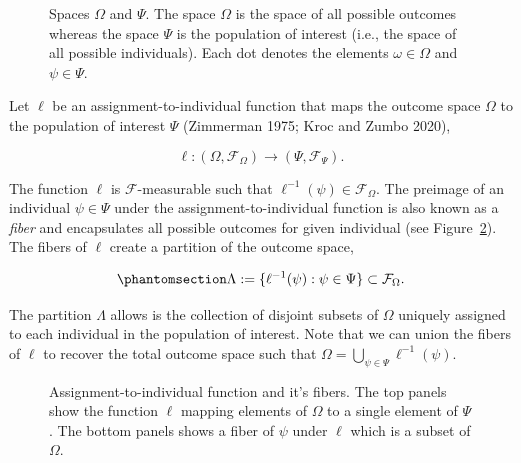 \documentclass[
  letterpaper,
  DIV=11,
  numbers=noendperiod]{scrreprt}
\begin{document}
\begin{figure}[H]


\caption{\label{fig-spaces}Spaces \(\Omega\) and \(\Psi\). The space
\(\Omega\) is the space of all possible outcomes whereas the space
\(\Psi\) is the population of interest (i.e., the space of all possible
individuals). Each dot denotes the elements \(\omega\in\Omega\) and
\(\psi\in\Psi\).}

\end{figure}%

Let \(\ell\) be an assignment-to-individual function that maps the
outcome space \(\Omega\) to the population of interest \(\Psi\)
(Zimmerman 1975; Kroc and Zumbo 2020),

\[
\ell: (\Omega,\mathcal{F}_\Omega) \rightarrow (\Psi,\mathcal{F}_\Psi).
\]

The function \(\ell\) is \(\mathcal{F}\)-measurable such that
\(\ell^{-1}(\psi) \in \mathcal{F}_{\Omega}\). The preimage of an
individual \(\psi\in\Psi\) under the assignment-to-individual function
is also known as a \emph{fiber} and encapsulates all possible outcomes
for given individual (see Figure~\ref{fig-fibers}). The fibers of
\(\ell\) create a partition of the outcome space,

\begin{equation}\phantomsection\label{eq-sigma-field-ell}{
\Lambda :=  \{\ell^{-1}(\psi) : \psi \in \Psi\} \subset \mathcal{F}_\Omega.
}\end{equation}

The partition \(\Lambda\) allows is the collection of disjoint subsets
of \(\Omega\) uniquely assigned to each individual in the population of
interest. Note that we can union the fibers of \(\ell\) to recover the
total outcome space such that
\(\Omega = \bigcup_{\psi\in\Psi}\ell^{-1}(\psi)\).

\begin{figure}[H]


\caption{\label{fig-fibers}Assignment-to-individual function and it's
fibers. The top panels show the function \(\ell\) mapping elements of
\(\Omega\) to a single element of \(\Psi\). The bottom panels shows a
fiber of \(\psi\) under \(\ell\) which is a subset of \(\Omega\).}

\end{figure}%
\end{document}
